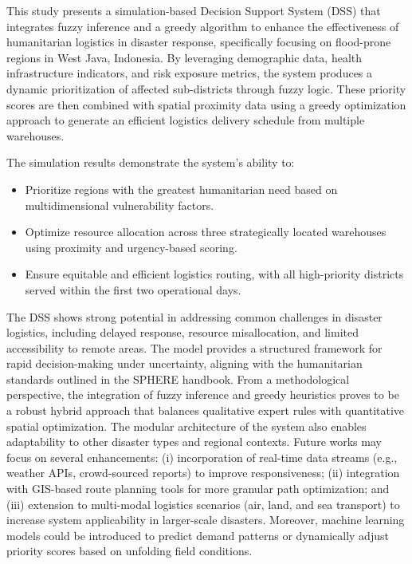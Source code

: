 \documentclass[conference,final,a4paper,twoside,10pt]{IEEEtran}
\begin{document}
This study presents a simulation-based Decision Support System (DSS) that integrates fuzzy inference and a greedy algorithm to enhance the effectiveness of humanitarian logistics in disaster response, specifically focusing on flood-prone regions in West Java, Indonesia. By leveraging demographic data, health infrastructure indicators, and risk exposure metrics, the system produces a dynamic prioritization of affected sub-districts through fuzzy logic. These priority scores are then combined with spatial proximity data using a greedy optimization approach to generate an efficient logistics delivery schedule from multiple warehouses.

The simulation results demonstrate the system's ability to:
\begin{itemize}
    \item Prioritize regions with the greatest humanitarian need based on multidimensional vulnerability factors.
    \item Optimize resource allocation across three strategically located warehouses using proximity and urgency-based scoring.
    \item Ensure equitable and efficient logistics routing, with all high-priority districts served within the first two operational days.
\end{itemize}

The DSS shows strong potential in addressing common challenges in disaster logistics, including delayed response, resource misallocation, and limited accessibility to remote areas. The model provides a structured framework for rapid decision-making under uncertainty, aligning with the humanitarian standards outlined in the SPHERE handbook.
From a methodological perspective, the integration of fuzzy inference and greedy heuristics proves to be a robust hybrid approach that balances qualitative expert rules with quantitative spatial optimization. The modular architecture of the system also enables adaptability to other disaster types and regional contexts.
Future works may focus on several enhancements: (i) incorporation of real-time data streams (e.g., weather APIs, crowd-sourced reports) to improve responsiveness; (ii) integration with GIS-based route planning tools for more granular path optimization; and (iii) extension to multi-modal logistics scenarios (air, land, and sea transport) to increase system applicability in larger-scale disasters. Moreover, machine learning models could be introduced to predict demand patterns or dynamically adjust priority scores based on unfolding field conditions.
\end{document}
